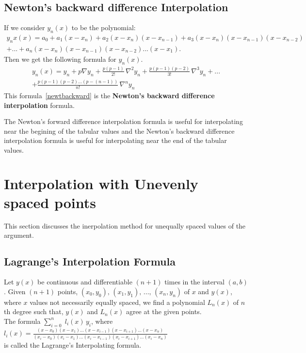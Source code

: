 \documentclass[aima203_lecturenotes_ku.tex]{subfiles}
\begin{document}
\subsection{Newton's backward difference Interpolation}
If we consider $y_n(x)$ to be the polynomial:
\begin{equation}
  \begin{gathered}
  y_nx(x)= a_0 +a_1(x-x_n) +a_2(x-x_n)(x-x_{n-1})+a_3(x-x_n)(x-x_{n-1})(x-x_{n-2}) \\[1mm]
  + ... + a_n(x-x_n)(x-x_{n-1})(x-x_{n-2})...(x-x_1).
  \end{gathered}
\end{equation}
Then we get the following formula for $y_n(x)$.
\begin{equation}
  \label{newtbackward}
 \begin{gathered}
  y_n(x) = y_n + p \nabla y_n + \frac{p(p-1)}{2!}\, \nabla ^2 y_n + \frac{p(p-1)(p-2)}{3!}\, \nabla ^3 y_n + ... \\[1mm]
  + \frac{p(p-1)(p-2)...(p-(n-1))}{n!}\, \nabla ^n y_n
\end{gathered}
\end{equation}
This formula~\ref{newtbackward} is the \textbf{Newton's backward difference interpolation} formula.

\begin{remark}
The Newton's forward difference interpolation formula is useful for interpolating near the begining of the tabular values and the Newton's backward difference interpolation formula is useful for interpolating near the end of the tabular values.
\end{remark}

\section{Interpolation with Unevenly spaced points}
This section discusses the inerpolation method for unequally spaced values of the argument.

\subsection{Lagrange's Interpolation Formula}
Let $y(x)$ be continuous and differentiable $(n+1)$ times in the interval $(a,b)$. Given $(n+1)$ points, $(x_0,y_0), \, (x_1,y_1), \, ..., \, (x_n,y_n)$ of $x$ and $y(x)$, where $x$ values not necessarily equally spaced, we find a polynomial $L_n(x)$ of $n$th degree such that, $y(x)$ and $L_n(x)$ agree at the given points. \\
The formula $\sum_{i=0}^n \; l_i(x)\, y_i$, where $\displaystyle l_i(x) = \frac{(x-x_0)(x-x_1)...(x-x_{i-1})(x-x_{i+1})...(x-x_n)}{(x_i-x_0)(x_i-x_1)...(x_i-x_{i-1})(x_i-x_{i+1})...(x_i-x_n)} $ \\[2mm]  is called the Lagrange's Interpolating formula.
\end{document}
